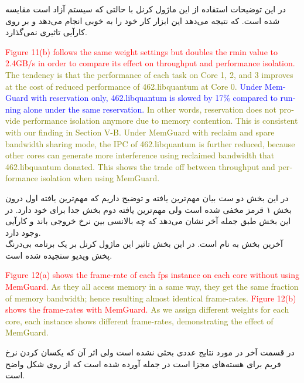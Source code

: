 \documentclass[a4paper, 11pt]{article}
\begin{document}
در این توضیحات استفاده از این ماژول کرنل با حالتی که سیستم آزاد است مقایسه شده است.
که نتیجه می‌دهد این ابزار کار خود را به خوبی انجام می‌دهد و بر روی کارآیی تاثیری نمی‌گذارد.
\begin{latin}
\textcolor{red}{Figure 11(b) follows the same weight settings but doubles
the rmin value to 2.4GB/s in order to compare its effect on
throughput and performance isolation.}
\textcolor{olive}{The tendency is that
the performance of each task on Core 1, 2, and 3 improves
at the cost of reduced performance of 462.libquantum at Core
0.}
\textcolor{blue}{Under MemGuard with reservation only, 462.libquantum is
slowed by 17\% compared to running alone under the same
reservation.}
\textcolor{olive}{In other words, reservation does not provide performance isolation anymore due to memory contention. This is
consistent with our finding in Section V-B. Under MemGuard
with reclaim and spare bandwidth sharing mode, the IPC of
462.libquantum is further reduced, because other cores can
generate more interference using reclaimed bandwidth that
462.libquantum donated. This shows the trade off between
throughput and performance isolation when using MemGuard.}
\end{latin}
در این بخش دو ست بیان مهم‌ترین یافته و توضیح داریم که مهم‌ترین یافته
اول درون بخش ۱ قرمز مخفی شده است ولی مهم‌ترین یافته دوم بخش جدا برای خود دارد.
در این بخش طبق جمله آخر نشان می‌دهد که چه بالانسی بین نرخ خروجی باند و کارآیی وجود دارد. \\
آخرین بخش به نام
است. در این بخش تاثیر این ماژول کرنل بر یک برنامه بی‌درنگ پخش ویدیو سنجیده شده است.
\begin{latin}
\textcolor{red}{Figure 12(a) shows the frame-rate of each fps instance
on each core without using MemGuard.}
\textcolor{olive}{As they all access
memory in a same way, they get the same fraction of memory bandwidth; hence resulting almost identical frame-rates.}
\textcolor{red}{Figure 12(b) shows the frame-rates with MemGuard.}
\textcolor{olive}{As we
assign different weights for each core, each instance shows
different frame-rates, demonstrating the effect of MemGuard.}
\end{latin}
در قسمت آخر در مورد نتایج عددی بحثی نشده است ولی اثر آن که یکسان کردن
نرخ فریم برای هسته‌های مجزا است در جمله آورده شده است که از روی شکل واضح است.

\end{document}

